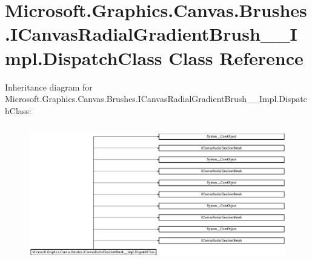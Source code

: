 \hypertarget{class_microsoft_1_1_graphics_1_1_canvas_1_1_brushes_1_1_i_canvas_radial_gradient_brush_____impl_1_1_dispatch_class}{}\section{Microsoft.\+Graphics.\+Canvas.\+Brushes.\+I\+Canvas\+Radial\+Gradient\+Brush\+\_\+\+\_\+\+Impl.\+Dispatch\+Class Class Reference}
\label{class_microsoft_1_1_graphics_1_1_canvas_1_1_brushes_1_1_i_canvas_radial_gradient_brush_____impl_1_1_dispatch_class}
Inheritance diagram for Microsoft.\+Graphics.\+Canvas.\+Brushes.\+I\+Canvas\+Radial\+Gradient\+Brush\+\_\+\+\_\+\+Impl.\+Dispatch\+Class\+:\begin{figure}[H]
\begin{center}
\leavevmode
\includegraphics[height=6.027397cm]{class_microsoft_1_1_graphics_1_1_canvas_1_1_brushes_1_1_i_canvas_radial_gradient_brush_____impl_1_1_dispatch_class}
\end{center}
\end{figure}
